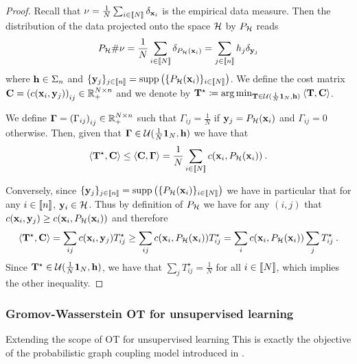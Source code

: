 \begin{proof}
Recall that $\nu = \frac{1}{N} \sum_{i \in {[\![N]\!]}} \delta_{{\mathbf{x}}_i}$ is the empirical data measure. Then the distribution of the data projected onto the space ${\mathcal{H}}$ by $P_{{\mathcal{H}}}$ reads
\begin{align}
    P_{{\mathcal{H}}} \# \nu = \frac{1}{N} \sum_{i \in {[\![N]\!]}} \delta_{P_{{\mathcal{H}}}({\mathbf{x}}_{i})} = \sum_{j \in {[\![n]\!]}} h_j \delta_{{\mathbf{y}}_{j}}
\end{align} 
where ${\mathbf{h}} \in \Sigma_n$ and $\{{\mathbf{y}}_j \}_{j \in {[\![n]\!]}} = \text{supp}\left( \{P_{{\mathcal{H}}}({\mathbf{x}}_{i}) \}_{i \in {[\![N]\!]}} \right)$. We define the cost matrix ${\mathbf{C}} = \left( c({\mathbf{x}}_i, {\mathbf{y}}_j) \right)_{ij} \in \mathbb{R}_+^{N \times n}$ and we denote by ${\mathbf{T}}^\star \coloneqq \operatorname*{arg\,min}_{{\mathbf{T}} \in {\mathcal{U}}(\frac{1}{N} \bm{1}_N, {\mathbf{h}})} \: \langle {\mathbf{T}}, {\mathbf{C}} \rangle$.

We define $\mathbf{\Gamma} = \left( \Gamma_{ij} \right)_{ij} \in \mathbb{R}_+^{N \times n}$ such that $\Gamma_{ij} = \frac{1}{N}$ if ${\mathbf{y}}_j = P_{{\mathcal{H}}}({\mathbf{x}}_i)$ and $\Gamma_{ij} = 0$ otherwise.
Then, given that $\mathbf{\Gamma} \in {\mathcal{U}}(\frac{1}{N} \bm{1}_N, {\mathbf{h}})$ we have that
\begin{align}
    \langle {\mathbf{T}}^\star, {\mathbf{C}} \rangle \leq \langle {\mathbf{C}}, \mathbf{\Gamma} \rangle = \frac{1}{N} \sum_{i \in {[\![N]\!]}} c(\mathbf{x}_i, P_{{\mathcal{H}}}(\mathbf{x}_i)) \:.
\end{align}

Conversely, since $\{{\mathbf{y}}_j \}_{j \in {[\![n]\!]}} = \text{supp}\left( \{P_{{\mathcal{H}}}({\mathbf{x}}_{i}) \}_{i \in {[\![N]\!]}} \right)$ we have in particular that for any $i \in {[\![n]\!]}$, ${\mathbf{y}}_i \in {\mathcal{H}}$. Thus by definition of $P_{{\mathcal{H}}}$ we have for any $(i,j)$ that $c({\mathbf{x}}_i, {\mathbf{y}}_j) \geq c({\mathbf{x}}_i, P_{{\mathcal{H}}}({\mathbf{x}}_i))$ and therefore
\begin{align}
    \langle {\mathbf{T}}^\star, {\mathbf{C}} \rangle = \sum_{ij} c({\mathbf{x}}_i, {\mathbf{y}}_j) T^\star_{ij} \geq \sum_{ij} c({\mathbf{x}}_i, P_{{\mathcal{H}}}({\mathbf{x}}_i)) T^\star_{ij} = \sum_{i} c({\mathbf{x}}_i, P_{{\mathcal{H}}}({\mathbf{x}}_i)) \sum_j T^\star_{ij} \:. 
\end{align}
Since ${\mathbf{T}}^\star \in {\mathcal{U}}(\frac{1}{N} \bm{1}_N, {\mathbf{h}})$, we have that $\sum_j T^\star_{ij} = \frac{1}{N}$ for all $i \in {[\![N]\!]}$, which implies the other inequality.


\end{proof}


\subsubsection{Gromov-Wasserstein OT for unsupervised learning}



\begin{prob}{Extending the scope of OT for unsupervised learning}\label{prob:ot_unsupervised}
    This is exactly the objective of the probabilistic graph coupling model introduced in .
\end{prob}
